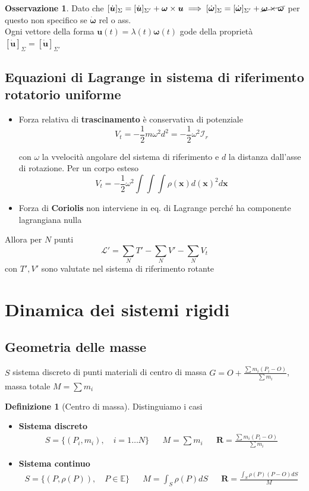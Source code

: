 \documentclass[a4paper,10pt]{article}
\theoremstyle{definition}
\newcommand{\bv}{\boldsymbol} %
\theoremstyle{indentdefinition}
\newtheorem{defn}{Definizione}[section]
\theoremstyle{indenttheorem}
\theoremstyle{myremark}
\newtheorem*{rem*}{Osservazione}
\theoremstyle{indentgeneral}
\begin{document}
\begin{rem*}
    Dato che     $[\dot{\bv{u}}]_\Sigma=[\dot{\bv{u}}]_{\Sigma'}+\bv{\omega}\times\bv{u} \implies [\dot{\bv{\omega}}]_\Sigma=[\dot{\bv{\omega}}]_{\Sigma'}+\cancel{\bv{\omega}\times\bv{\omega}}$ per questo non specifico se $\dot{\bv{\omega}}$ rel o ass. \\
    Ogni vettore della forma $\bv{u}(t)=\lambda(t)\bv{\omega}(t)$ gode della proprietà $[\dot{\bv{u}}]_\Sigma=[\dot{\bv{u}}]_{\Sigma'}$
\end{rem*}

\subsection{Equazioni di Lagrange in sistema di riferimento rotatorio uniforme}
\begin{itemize}
    \item Forza relativa di \textbf{trascinamento} è conservativa di potenziale $$V_t=-\frac{1}{2}m\omega^2d^2=-\frac{1}{2}\omega^2\mathcal{I}_r$$ 
   
    con $\omega$ la vvelocità angolare del sistema di riferimento e $d$ la distanza dall'asse di rotazione. Per un corpo esteso
     $$V_t=-\frac{1}{2}\omega^2\int\int\int\rho(\bv{x})d(\bv{x})^2d\bv{x}$$
    \item Forza di \textbf{Coriolis} non interviene in eq. di Lagrange perché ha componente lagrangiana nulla
\end{itemize}
Allora per $N$ punti
$$ \mathcal{L}'=\sum_N T'-\sum_N V'-\sum_N V_t$$
con $T',V'$ sono valutate nel sistema di riferimento rotante


\pagebreak{}

\section{Dinamica dei sistemi rigidi}
\subsection{Geometria delle masse}

$S$ sistema discreto di punti materiali di centro di massa
$G=O+\frac{\sum m_{i}\left(P_{i}-O\right)}{\sum m_{i}}$, massa totale
$M=\sum m_{i}$

\begin{defn}[Centro di massa] Distinguiamo i casi
\begin{itemize}
    \item \textbf{Sistema discreto}
    \begin{align*}
        S=\{(P_i,m_i),\quad i=1\dots N\} & & M=\sum m_i & & \bv{R}=\frac{\sum m_{i}\left(P_{i}-O\right)}{\sum m_{i}}
    \end{align*}
    \item \textbf{Sistema continuo}
    \begin{align*}
        S=\{(P,\rho(P)),\quad P\in \mathbb{E}\} & & M=\int_S \rho(P)dS & & \bv{R}=\frac{\int_S \rho(P)\left(P-O\right)dS}{M}
    \end{align*}
\end{itemize}
    
\end{defn}
\end{document}
